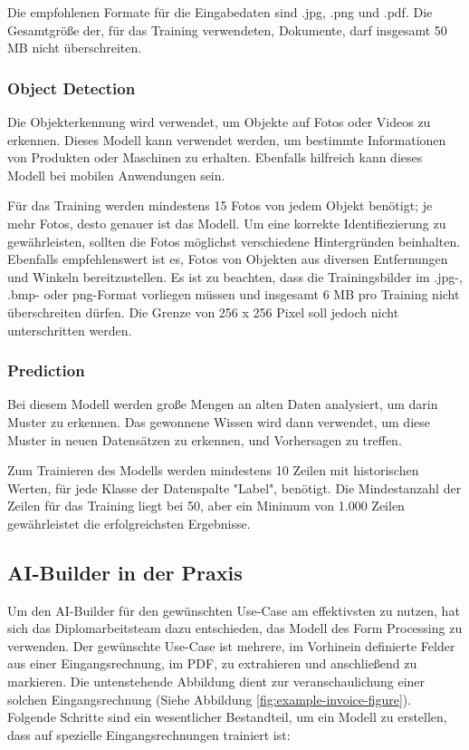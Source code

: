 Die empfohlenen Formate für die Eingabedaten sind .jpg, .png und .pdf. Die Gesamtgröße der, für das Training verwendeten, Dokumente, darf insgesamt 50 MB nicht überschreiten.

\subsubsection{Object Detection}

Die Objekterkennung wird verwendet, um Objekte auf Fotos oder Videos zu erkennen. Dieses Modell kann verwendet werden, um bestimmte Informationen von Produkten oder Maschinen zu erhalten. Ebenfalls hilfreich kann dieses Modell bei mobilen Anwendungen sein.

Für das Training werden mindestens 15 Fotos von jedem Objekt benötigt; je mehr Fotos, desto genauer ist das Modell.  Um eine korrekte Identifiezierung zu gewährleisten, sollten die Fotos möglichst verschiedene Hintergründen beinhalten. Ebenfalls empfehlenswert ist es, Fotos von Objekten aus diversen Entfernungen und Winkeln bereitzustellen. Es ist zu beachten, dass die Trainingsbilder im .jpg-, .bmp- oder png-Format vorliegen müssen und insgesamt 6 MB pro Training nicht überschreiten dürfen. Die Grenze von 256 x 256 Pixel soll jedoch nicht unterschritten werden.

\subsubsection{Prediction} 

Bei diesem Modell werden große Mengen an alten Daten analysiert, um darin Muster zu erkennen. Das gewonnene Wissen wird dann verwendet, um diese Muster in neuen Datensätzen zu erkennen, und Vorhersagen zu treffen.

Zum Trainieren des Modells werden mindestens 10 Zeilen mit historischen Werten, für jede Klasse der Datenspalte "Label", benötigt. Die Mindestanzahl der Zeilen für das Training liegt bei 50, aber ein Minimum von 1.000 Zeilen gewährleistet die erfolgreichsten Ergebnisse.

\subsection{AI-Builder in der Praxis}

Um den AI-Builder für den gewünschten Use-Case am effektivsten zu nutzen, hat sich das Diplomarbeitsteam dazu entschieden, das Modell des Form Processing zu verwenden. Der gewünschte Use-Case ist mehrere, im Vorhinein definierte Felder aus einer Eingangsrechnung, im PDF, zu extrahieren und anschließend zu markieren. 
Die untenstehende Abbildung dient zur veranschaulichung einer solchen Eingangsrechnung (Siehe Abbildung \ref{fig:example-invoice-figure}). Folgende Schritte sind ein wesentlicher Bestandteil, um ein Modell zu erstellen, dass auf spezielle Eingangsrechnungen trainiert ist:

